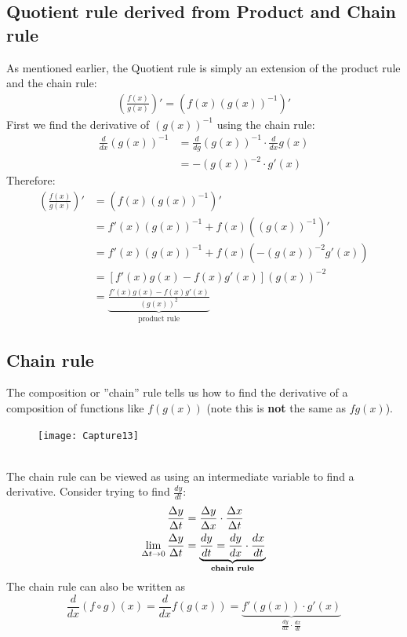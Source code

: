 \documentclass{report}
\begin{document}
\subsection{Quotient rule derived from Product and Chain rule} %
As mentioned earlier, the Quotient rule is simply an extension of the product rule and the
chain rule:
\begin{align*}
\left(\frac{f(x)}{g(x)}\right)'=(f(x)(g(x))^{-1})'
\end{align*}
First we find the derivative of $(g(x))^{-1}$ using the chain rule:
\begin{align*}
\frac{d}{dx}(g(x))^{-1}&=\frac{d}{dg}(g(x))^{-1}\cdot\frac{d}{dx}g(x)\\
&=-(g(x))^{-2}\cdot g'(x)
\end{align*}
Therefore:
\begin{align*}
\left(\frac{f(x)}{g(x)}\right)'&=(f(x)(g(x))^{-1})'\\
&=f'(x)(g(x))^{-1}+f(x)((g(x))^{-1})'\\
&=f'(x)(g(x))^{-1}+f(x)(-(g(x))^{-2}g'(x))\\
&=\left[f'(x)g(x)-f(x)g'(x)\right](g(x))^{-2}\\
&=\underbrace{\frac{f'(x)g(x)-f(x)g'(x)}{(g(x))^2}}_{\text{product rule}}
\end{align*}
\newpage

\subsection{Chain rule} %
The composition or ''chain'' rule tells us how to find the derivative of a composition of
functions like $f(g(x))$ (note this is \textbf{not} the same as $fg(x)$).
\begin{figure}[h]
\texttt{[image: Capture13]}
\centering\\
\end{figure}\\
The chain rule can be viewed as using an intermediate variable to find a derivative. Consider
trying to find $\frac{dy}{dt}$:
\begin{align*}
\frac{\Delta y}{\Delta t}&=\frac{\Delta y}{\Delta x}\cdot\frac{\Delta x}{\Delta t}\\
\lim_{\Delta t\to0}\frac{\Delta y}{\Delta t}&=
\underbrace{\frac{dy}{dt}=\frac{dy}{dx}\cdot\frac{dx}{dt}}_{\text{\textbf{chain rule}}}
\end{align*}
The chain rule can also be written as
\begin{equation*}
\frac{d}{dx}(f\circ g)(x)=\frac{d}{dx}f(g(x))=\underbrace{f'(g(x))\cdot g'(x)}
_{\frac{dy}{dx}\cdot\frac{dx}{dt}}
\end{equation*}
\end{document}
